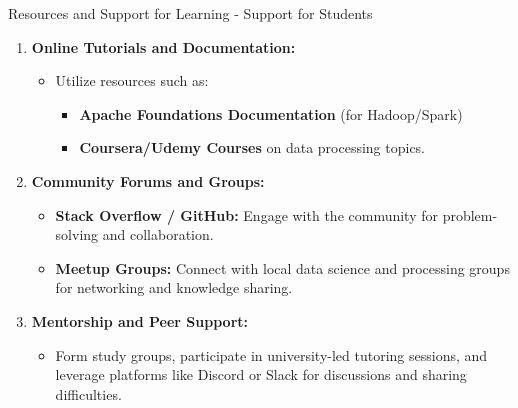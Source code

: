 \documentclass[aspectratio=169]{beamer}
\begin{document}
\begin{frame}[fragile]{Resources and Support for Learning - Support for Students}
    \begin{enumerate}
        \item \textbf{Online Tutorials and Documentation:}
            \begin{itemize}
                \item Utilize resources such as:
                \begin{itemize}
                    \item \textbf{Apache Foundations Documentation} (for Hadoop/Spark)
                    \item \textbf{Coursera/Udemy Courses} on data processing topics.
                \end{itemize}
            \end{itemize}

        \item \textbf{Community Forums and Groups:}
            \begin{itemize}
                \item \textbf{Stack Overflow / GitHub:} Engage with the community for problem-solving and collaboration.
                \item \textbf{Meetup Groups:} Connect with local data science and processing groups for networking and knowledge sharing.
            \end{itemize}

        \item \textbf{Mentorship and Peer Support:}
            \begin{itemize}
                \item Form study groups, participate in university-led tutoring sessions, and leverage platforms like Discord or Slack for discussions and sharing difficulties.
            \end{itemize}
    \end{enumerate}
\end{frame}
\end{document}
